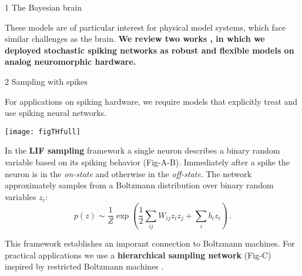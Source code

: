 \begin{frame}
\begin{columns}
\begin{column}{0.99\textwidth}
\begin{columns}[t]
\begin{column}{0.32\textwidth}
\begin{block}{\large 1 The Bayesian brain}
					\begin{adjustwidth}{1cm}{1cm}
					
					These models are of particular interest for physical model systems, which face similar challenges as the brain.
					\textbf{We review two works \cite{dold2019stochasticity,kungl2019accelerated}, in which we deployed stochastic spiking networks as robust and flexible models on  analog neuromorphic hardware.}

					\end{adjustwidth}

					\blockSpaceOne
					\end{block}


					\interBlockSpaceOne



					\begin{block}{\large 2 Sampling with spikes}
					\blockSpaceOne

					\begin{adjustwidth}{1.cm}{1.cm}
					\justifying
					For applications on spiking hardware, we require models that explicitly treat and use spiking neural networks.

					\thirdBlockImSpace					\begin{center}
						\texttt{[image: figTHfull]}
					\end{center}
					\thirdBlockImSpace

					In the \textbf{LIF sampling} framework \cite{petrovici2016stochastic} a single neuron describes a binary random variable based on its spiking behavior (Fig-A-B).
					Immediately after a spike the neuron is in the \emph{on-state} and otherwise in the \emph{off-state}.
					The network approximately samples from a Boltzmann distribution over binary random variables $z_i$:
					\thirdBlockImSpace
					\begin{equation}
					p(z) \sim \frac{1}{Z} \exp \left ( \frac{1}{2} \sum_{ij} W_{ij} z_i z_j + \sum_{i} b_i z_i  \right)\, .
					\end{equation}
					\thirdBlockImSpace
					\end{adjustwidth}
					This framework establishes an imporant connection to Boltzmann machines.
					For practical applications we use a \textbf{hierarchical sampling network} (Fig-C) inspired by restricted Boltzmann machines \cite{hinton1984boltzmann}.



					\blockSpaceOne
					\end{block}



\end{column}
\end{columns}
\end{column}
\end{columns}
\end{frame}
